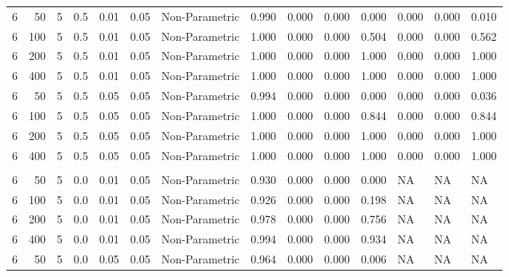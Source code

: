 \begin{table}
{{\begin{tabular}{rrrrrrllllllll}
\hspace{1em}6 & 50 & 5 & 0.5 & 0.01 & 0.05 & Non-Parametric & 0.990 & 0.000 & 0.000 & 0.000 & 0.000 & 0.000 & 0.010\\
\hspace{1em}6 & 100 & 5 & 0.5 & 0.01 & 0.05 & Non-Parametric & 1.000 & 0.000 & 0.000 & 0.504 & 0.000 & 0.000 & 0.562\\
\hspace{1em}6 & 200 & 5 & 0.5 & 0.01 & 0.05 & Non-Parametric & 1.000 & 0.000 & 0.000 & 1.000 & 0.000 & 0.000 & 1.000\\
\hspace{1em}6 & 400 & 5 & 0.5 & 0.01 & 0.05 & Non-Parametric & 1.000 & 0.000 & 0.000 & 1.000 & 0.000 & 0.000 & 1.000\\
\hspace{1em}6 & 50 & 5 & 0.5 & 0.05 & 0.05 & Non-Parametric & 0.994 & 0.000 & 0.000 & 0.000 & 0.000 & 0.000 & 0.036\\
\hspace{1em}6 & 100 & 5 & 0.5 & 0.05 & 0.05 & Non-Parametric & 1.000 & 0.000 & 0.000 & 0.844 & 0.000 & 0.000 & 0.844\\
\hspace{1em}6 & 200 & 5 & 0.5 & 0.05 & 0.05 & Non-Parametric & 1.000 & 0.000 & 0.000 & 1.000 & 0.000 & 0.000 & 1.000\\
\hspace{1em}6 & 400 & 5 & 0.5 & 0.05 & 0.05 & Non-Parametric & 1.000 & 0.000 & 0.000 & 1.000 & 0.000 & 0.000 & 1.000\\
\addlinespace[0.3em]
\multicolumn{14}{l}{\textbf{$t_3$ Distribution}}\\
\hspace{1em}6 & 50 & 5 & 0.0 & 0.01 & 0.05 & Non-Parametric & 0.930 & 0.000 & 0.000 & 0.000 & NA & NA & NA\\
\hspace{1em}6 & 100 & 5 & 0.0 & 0.01 & 0.05 & Non-Parametric & 0.926 & 0.000 & 0.000 & 0.198 & NA & NA & NA\\
\hspace{1em}6 & 200 & 5 & 0.0 & 0.01 & 0.05 & Non-Parametric & 0.978 & 0.000 & 0.000 & 0.756 & NA & NA & NA\\
\hspace{1em}6 & 400 & 5 & 0.0 & 0.01 & 0.05 & Non-Parametric & 0.994 & 0.000 & 0.000 & 0.934 & NA & NA & NA\\
\hspace{1em}6 & 50 & 5 & 0.0 & 0.05 & 0.05 & Non-Parametric & 0.964 & 0.000 & 0.000 & 0.006 & NA & NA & NA\\

\end{tabular}}}
\end{table}
